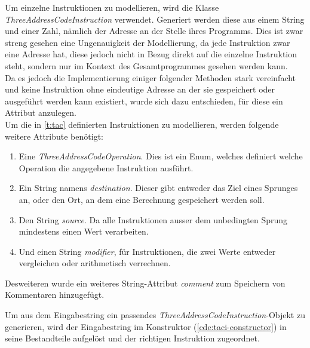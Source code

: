 Um einzelne Instruktionen zu modellieren, wird die Klasse 
\textit{ThreeAddressCodeInstruction} verwendet.
Generiert werden diese aus einem String und einer Zahl, nämlich der
Adresse an der Stelle ihres Programms.
Dies ist zwar streng gesehen eine Ungenauigkeit der Modellierung, 
da jede Instruktion zwar eine Adresse hat, 
diese jedoch nicht in Bezug direkt auf die einzelne Instruktion steht,
sondern nur im Kontext des Gesamtprogrammes gesehen werden kann.\\
Da es jedoch die Implementierung einiger folgender Methoden stark vereinfacht
und keine Instruktion ohne eindeutige Adresse an der sie gespeichert oder ausgeführt werden kann
existiert, wurde sich dazu entschieden, für diese ein Attribut anzulegen.\\

Um die in \cref{t:tac} definierten Instruktionen zu modellieren, werden folgende
weitere Attribute benötigt:
\begin{enumerate}
  \item Eine \textit{ThreeAddressCodeOperation}. Dies ist ein Enum, welches definiert
    welche Operation die angegebene Instruktion ausführt.
  \item Ein String namens \textit{destination}. Dieser gibt entweder das Ziel eines Sprunges an,
    oder den Ort, an dem eine Berechnung gespeichert werden soll.
  \item Den String \textit{source}. Da alle Instruktionen ausser dem unbedingten Sprung
    mindestens einen Wert verarbeiten.
  \item Und einen String \textit{modifier}, für Instruktionen, die zwei Werte
    entweder vergleichen oder arithmetisch verrechnen.
\end{enumerate}
Desweiteren wurde ein weiteres String-Attribut \textit{comment} zum Speichern von Kommentaren
hinzugefügt.

Um aus dem Eingabestring ein passendes \textit{ThreeAddressCodeInstruction}-Objekt
zu generieren, wird der Eingabestring im Konstruktor (\cref{cde:taci-constructor})
in seine Bestandteile aufgelöst und der richtigen Instruktion zugeordnet.


